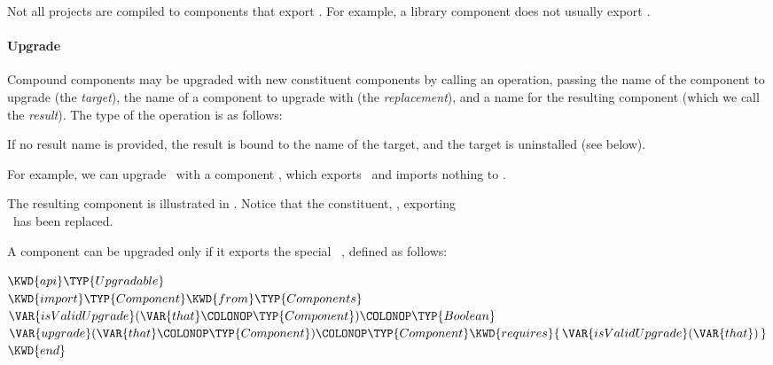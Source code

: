 Not all projects are compiled to components
that export \execapi.
For example, a library component does not usually export \execapi.


\paragraph{Upgrade}

Compound components may be upgraded
with new constituent components by calling an  operation,
passing the name of the component to upgrade (the \emph{target}),
the name of a component to upgrade with (the \emph{replacement}),
and a name for the resulting component (which we call the \emph{result}).
The type of the  operation is as follows:


If no result name is provided,
the result is bound to the name of the target,
and the target is uninstalled (see below).

For example,
we can upgrade \coolcrypto\
with a component \coolsec,
which exports \fortsec\
and imports nothing to .


The resulting component is illustrated in \figref{upgraded}.
Notice that the constituent, \ironsec, exporting \\
\fortsec\
has been replaced.

A component can be upgraded
only if it exports the special \apiN\ \upgapi,
defined as follows:

%
%
\begin{Fortress}
\(\KWD{api} \TYP{Upgradable}\)\\
\(\KWD{import} \TYP{Component} \KWD{from} \TYP{Components}\)\\[4pt]
\(\VAR{isValidUpgrade}(\VAR{that}\COLONOP\TYP{Component})\COLONOP\TYP{Boolean}\)\\
\(\VAR{upgrade}(\VAR{that}\COLONOP\TYP{Component})\COLONOP\TYP{Component} \KWD{requires} \{\,\VAR{isValidUpgrade}(\VAR{that})\,\}\)\\[4pt]
\(\KWD{end}\)
\end{Fortress}



